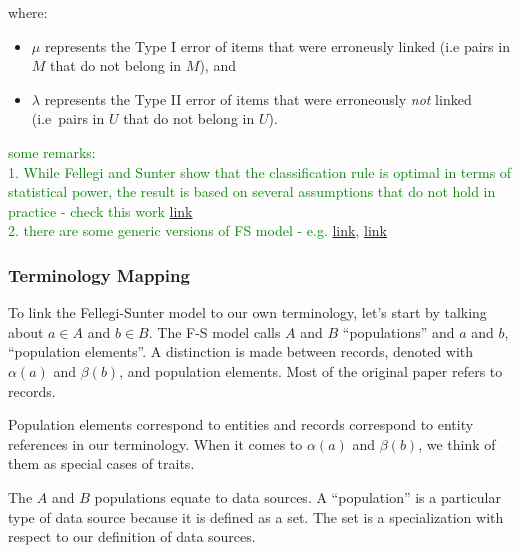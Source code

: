 \documentclass[journal]{IEEEtran}
\begin{document}
    where:

    \begin{itemize}
        \item $\mu$ represents the Type I error of items that were erroneusly
        linked (i.e pairs in $M$ that do not belong in $M$), and
        \item $\lambda$ represents the Type II error of items that were
        erroneously \textit{not} linked (i.e~pairs in $U$ that do not belong in
        $U$).
    \end{itemize}


    \textcolor{green}{some remarks:\\ 
    1. While Fellegi and Sunter show that the classification rule is optimal in terms of statistical power, the result is based on several assumptions that do not hold in practice - check this work \href{https://www.jstor.org/stable/23024863?seq=1}{link}\\
    2. there are some generic versions of FS model - e.g. \href{https://www.jstor.org/stable/pdf/24246450.pdf}{link}, \href{https://projecteuclid.org/journals/annals-of-applied-statistics/volume-8/issue-4/Detecting-duplicates-in-a-homicide-registry-using-a-Bayesian-partitioning/10.1214/14-AOAS779.full}{link}\\
    }

    \subsubsection[fms-term]{Terminology Mapping}\label{subsubsec:fsm-term}

    To link the Fellegi-Sunter model to our own terminology, let's start by
    talking about $a \in A$ and $b \in B$.
    The F-S model calls $A$ and $B$ ``populations'' and $a$ and $b$,
    ``population elements''.
    A distinction is made between records, denoted with $\alpha(a)$ and
    $\beta(b)$, and population elements.
    Most of the original paper refers to records.

    Population elements correspond to entities and records correspond to entity
    references in our terminology.
    When it comes to $\alpha(a)$ and $\beta(b)$, we think of them as special
    cases of traits.
        
    The $A$ and $B$ populations equate to data sources.
    A ``population'' is a particular type of data source because it is defined
    as a set.
    The set is a specialization with respect to our definition of data sources.
    
\end{document}
